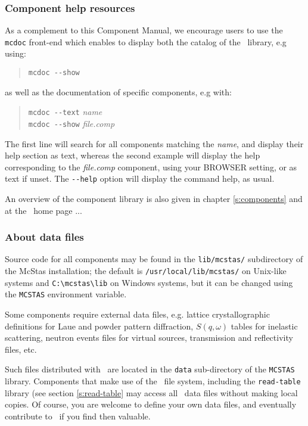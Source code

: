 \subsubsection{Component help resources}
As a complement to this Component Manual, we encourage users to use
the \verb+mcdoc+ front-end which enables to display both the
catalog of the \MCS\ library, e.g using: 
\begin{quote}
  \verb|mcdoc --show|
\end{quote}
as well as the documentation of specific components, e.g with:
\begin{quote}
  \verb|mcdoc --text| {\it name} \\
  \verb|mcdoc --show| {\it file.comp}
\end{quote}
The first line will search for all components matching the {\it name},
and display their help section as text,
whereas the second example will display the help corresponding to
the {\it file.comp} component, using your
BROWSER setting, or as text if unset.
The \verb+--help+ option will display the command help, as usual.

An overview of the component library is also given in chapter \ref{s:components} and at the \MCS\ home page \cite{mcstas_webpage}...

\subsubsection{About data files}
Source code for all components may be found in the \verb+lib/mcstas/+
subdirectory of the McStas installation;
the default is \verb+/usr/local/lib/mcstas/+
on Unix-like systems and \verb+C:\mcstas\lib+ on Windows systems, but it can be
changed using the \verb+MCSTAS+ environment variable.

Some components require external data files, e.g. lattice crystallographic definitions for Laue and powder pattern diffraction, $S(q,\omega)$ tables for inelastic scattering, neutron events files for virtual sources, transmission and reflectivity files, etc.

Such files distributed with \MCS\ are located in the \verb+data+ sub-directory of the \verb+MCSTAS+ library. Components that make use of the \MCS\ file system, including the \verb+read-table+ library (see section \ref{s:read-table} may access all \MCS\ data files without making local copies. Of course, you are welcome to define your own data files, and eventually contribute to \MCS\ if you find then valuable.






%